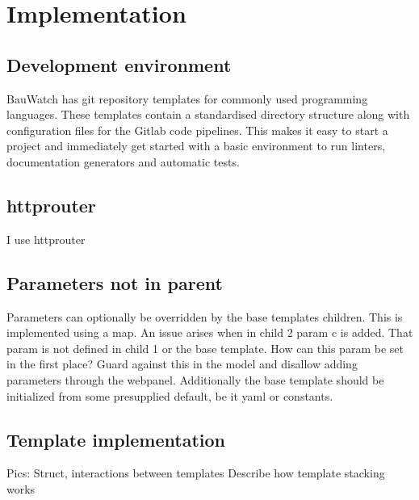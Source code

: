 \section{Implementation}
\subsection{Development environment}
BauWatch has git repository templates for commonly used programming languages. These templates contain a standardised directory structure along with configuration
files for the Gitlab code pipelines. This makes it easy to start a project and immediately get started with a basic environment to run linters, documentation
generators and automatic tests.

\subsection{httprouter}
I use httprouter

\subsection{Parameters not in parent}
Parameters can optionally be overridden by the base templates children. This is implemented using a map.
An issue arises when in child 2 param c is added. That param is not defined in child 1 or the base template.
How can this param be set in the first place?
Guard against this in the model and disallow adding parameters through the webpanel.
Additionally the base template should be initialized from some presupplied default, be it yaml or constants.

\subsection{Template implementation}
Pics:
Struct, interactions between templates
Describe how template stacking works
